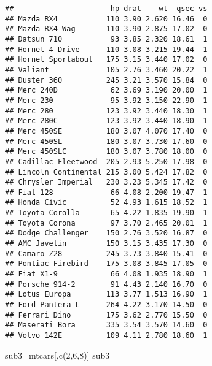 \documentclass[
]{article}
\newenvironment{Shaded}{\begin{snugshade}}{\end{snugshade}}
\newcommand{\DecValTok}[1]{\textcolor[rgb]{0.00,0.00,0.81}{#1}}
\newcommand{\FunctionTok}[1]{\textcolor[rgb]{0.00,0.00,0.00}{#1}}
\newcommand{\NormalTok}[1]{#1}
\newcommand{\OtherTok}[1]{\textcolor[rgb]{0.56,0.35,0.01}{#1}}
\begin{document}
\begin{verbatim}
##                      hp drat    wt  qsec vs
## Mazda RX4           110 3.90 2.620 16.46  0
## Mazda RX4 Wag       110 3.90 2.875 17.02  0
## Datsun 710           93 3.85 2.320 18.61  1
## Hornet 4 Drive      110 3.08 3.215 19.44  1
## Hornet Sportabout   175 3.15 3.440 17.02  0
## Valiant             105 2.76 3.460 20.22  1
## Duster 360          245 3.21 3.570 15.84  0
## Merc 240D            62 3.69 3.190 20.00  1
## Merc 230             95 3.92 3.150 22.90  1
## Merc 280            123 3.92 3.440 18.30  1
## Merc 280C           123 3.92 3.440 18.90  1
## Merc 450SE          180 3.07 4.070 17.40  0
## Merc 450SL          180 3.07 3.730 17.60  0
## Merc 450SLC         180 3.07 3.780 18.00  0
## Cadillac Fleetwood  205 2.93 5.250 17.98  0
## Lincoln Continental 215 3.00 5.424 17.82  0
## Chrysler Imperial   230 3.23 5.345 17.42  0
## Fiat 128             66 4.08 2.200 19.47  1
## Honda Civic          52 4.93 1.615 18.52  1
## Toyota Corolla       65 4.22 1.835 19.90  1
## Toyota Corona        97 3.70 2.465 20.01  1
## Dodge Challenger    150 2.76 3.520 16.87  0
## AMC Javelin         150 3.15 3.435 17.30  0
## Camaro Z28          245 3.73 3.840 15.41  0
## Pontiac Firebird    175 3.08 3.845 17.05  0
## Fiat X1-9            66 4.08 1.935 18.90  1
## Porsche 914-2        91 4.43 2.140 16.70  0
## Lotus Europa        113 3.77 1.513 16.90  1
## Ford Pantera L      264 4.22 3.170 14.50  0
## Ferrari Dino        175 3.62 2.770 15.50  0
## Maserati Bora       335 3.54 3.570 14.60  0
## Volvo 142E          109 4.11 2.780 18.60  1
\end{verbatim}

\begin{Shaded}
\begin{Highlighting}[]
\NormalTok{sub3}\OtherTok{=}\NormalTok{mtcars[,}\FunctionTok{c}\NormalTok{(}\DecValTok{2}\NormalTok{,}\DecValTok{6}\NormalTok{,}\DecValTok{8}\NormalTok{)]}
\NormalTok{sub3}
\end{Highlighting}
\end{Shaded}
\end{document}
